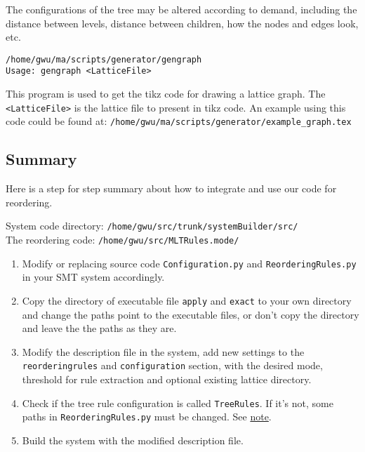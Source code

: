 The configurations of the tree may be altered according to demand, including the distance between levels, distance between children, how the nodes and edges look, etc.

\verb|/home/gwu/ma/scripts/generator/gengraph| \\
\verb|Usage: gengraph <LatticeFile>|

This program is used to get the tikz code for drawing a lattice graph. The \verb|<LatticeFile>| is the lattice file to present in tikz code. An example using this code could be found at:
\verb|/home/gwu/ma/scripts/generator/example_graph.tex|
	
\subsection{Summary}
\label{summary}

Here is a step for step summary about how to integrate and use our code for reordering.

System code directory: \verb|/home/gwu/src/trunk/systemBuilder/src/|\\
The reordering code: \verb|/home/gwu/src/MLTRules.mode/|

\begin{enumerate}
\item Modify or replacing source code \verb|Configuration.py| and \verb|ReorderingRules.py| in your SMT system accordingly.
\item Copy the directory of executable file \verb|apply| and \verb|exact| to your own directory and change the paths point to the executable files, or don't copy the directory and leave the the paths as they are.
\item Modify the description file in the system, add new settings to the \verb|reorderingrules| and \verb|configuration| section, with the desired mode, threshold for rule extraction and optional existing lattice directory.
\item Check if the tree rule configuration is called \verb|TreeRules|. If it's not, some paths in \verb|ReorderingRules.py| must be changed. See \hyperref[note]{note}.
\item Build the system with the modified description file.
\end{enumerate}
